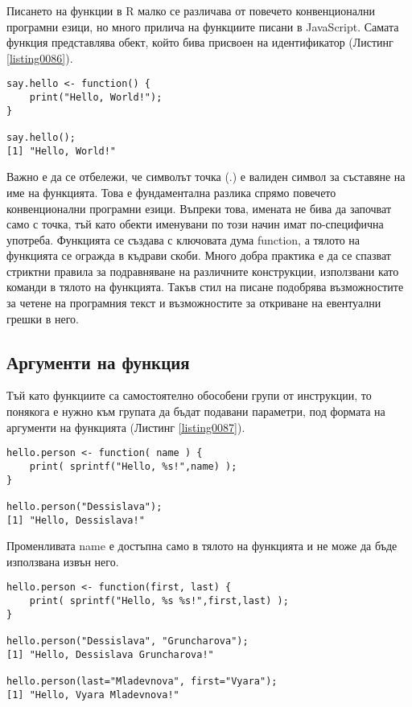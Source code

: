 Писането на функции в R малко се различава от повечето конвенционални програмни езици, но много прилича на функциите писани в JavaScript. Самата функция представлява обект, който бива присвоен на идентификатор (Листинг \ref{listing0086}).

\begin{lstlisting}[caption=Примерна потребителска функция, label=listing0086]
say.hello <- function() {
	print("Hello, World!");
}

say.hello();
[1] "Hello, World!"
\end{lstlisting}

Важно е да се отбележи, че символът точка (.) е валиден символ за съставяне на име на функцията. Това е фундаментална разлика спрямо повечето конвенционални програмни езици. Въпреки това, имената не бива да започват само с точка, тъй като обекти именувани по този начин имат по-специфична употреба. Функцията се създава с ключовата дума function, а тялото на функцията се огражда в къдрави скоби. Много добра практика е да се спазват стриктни правила за подравняване на различните конструкции, използвани като команди в тялото на функцията. Такъв стил на писане подобрява възможностите за четене на програмния текст и възможностите за откриване на евентуални грешки в него.

\subsection{Аргументи на функция}

Тъй като функциите са самостоятелно обособени групи от инструкции, то понякога е нужно към групата да бъдат подавани параметри, под формата на аргументи на функцията (Листинг \ref{listing0087}).

\begin{lstlisting}[caption=Извикване на функция с аргумент, label=listing0087]
hello.person <- function( name ) {
	print( sprintf("Hello, %s!",name) );
}

hello.person("Dessislava");
[1] "Hello, Dessislava!"
\end{lstlisting}

Променливата name е достъпна само в тялото на функцията и не може да бъде използвана извън него.

\begin{lstlisting}[caption=Извикване на функция с повече аргументи, label=listing0088]
hello.person <- function(first, last) {
	print( sprintf("Hello, %s %s!",first,last) );
}

hello.person("Dessislava", "Gruncharova");
[1] "Hello, Dessislava Gruncharova!"

hello.person(last="Mladevnova", first="Vyara");
[1] "Hello, Vyara Mladevnova!"
\end{lstlisting}

